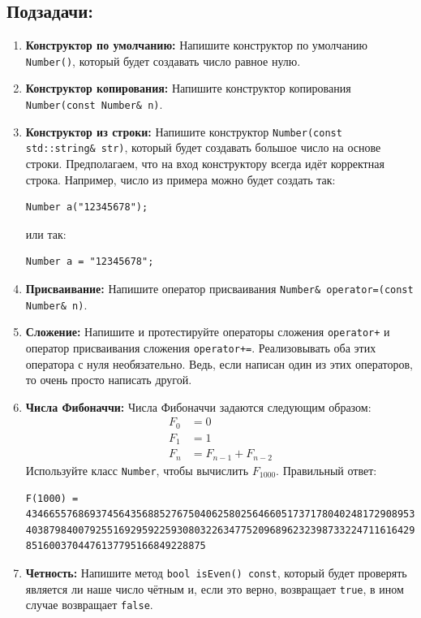 \documentclass{article}
\begin{document}
\subsection*{Подзадачи:}
\begin{enumerate}
\item \textbf{Конструктор по умолчанию:} Напишите конструктор по умолчанию \texttt{Number()}, который будет создавать число равное нулю.
\item \textbf{Конструктор копирования:} Напишите конструктор копирования \texttt{Number(const Number\& n)}.
\item \textbf{Конструктор из строки:} Напишите конструктор \texttt{Number(const std::string\& str)}, который будет создавать большое число на основе строки. Предполагаем, что на вход конструктору всегда идёт корректная строка. Например, число из примера можно будет создать так:
\begin{lstlisting}
Number a("12345678");
\end{lstlisting}
или так:
\begin{lstlisting}
Number a = "12345678";
\end{lstlisting}
\item \textbf{Присваивание:} Напишите оператор присваивания \texttt{Number\& operator=(const Number\& n)}.
\item \textbf{Сложение:} Напишите и протестируйте операторы сложения \texttt{operator+} и оператор присваивания сложения \texttt{operator+=}.  Реализовывать оба этих оператора с нуля необязательно. Ведь, если написан один из этих операторов, то очень просто написать другой.
\item \textbf{Числа Фибоначчи:} Числа Фибоначчи задаются следующим образом:
\begin{align*}
F_0 &= 0\\
F_1 &= 1\\
F_n &= F_{n-1} + F_{n-2}
\end{align*}
Используйте класс \texttt{Number}, чтобы вычислить $F_{1000}$. Правильный ответ:
\begin{verbatim}
F(1000) = 43466557686937456435688527675040625802564660517371780402481729089536555417949051890
40387984007925516929592259308032263477520968962323987332247116164299644090653318793829896964992
8516003704476137795166849228875
\end{verbatim}


\item \textbf{Четность:} Напишите метод \texttt{bool isEven() const}, который будет проверять является ли наше число чётным и, если это верно, возвращает \texttt{true}, в ином случае возвращает \texttt{false}.


\end{enumerate}
\end{document}
